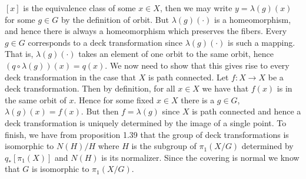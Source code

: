 \begin{bproof}
        $[x]$ is the equivalence class of some $x\in{X}$, then we may write
        $y=\lambda(g)(x)$ for some $g\in{G}$ by the definition of orbit. But
        $\lambda(g)(\cdot)$ is a homeomorphism, and hence there is always a
        homeomorphism which preserves the fibers. Every $g\in{G}$ corresponds to
        a deck transformation since $\lambda(g)(\cdot)$ is such a mapping. That
        is, $\lambda(g)(\cdot)$ takes an element of one orbit to the same orbit,
        hence $(q\circ\lambda(g))(x)=q(x)$. We now need to show that this gives
        rise to every deck transformation in the case that $X$ is path connected.
        Let $f:X\rightarrow{X}$ be a deck transformation. Then by definition,
        for all $x\in{X}$ we have that $f(x)$ is in the same orbit of $x$. Hence
        for some fixed $x\in{X}$ there is a $g\in{G}$, $\lambda(g)(x)=f(x)$.
        But then $f=\lambda(g)$ since $X$ is path connected and hence a deck
        transformation is uniquely determined by the image of a single point.
        To finish, we have from proposition 1.39 that the group of deck transformations
        is isomorphic to $N(H)/H$ where $H$ is the subgroup of $\pi_{1}(X/G)$
        determined by $q_{*}[\pi_{1}(X)]$ and $N(H)$ is its normalizer. Since
        the covering is normal we know that $G$ is isomorphic to $\pi_{1}(X/G)$.
    \end{bproof}
